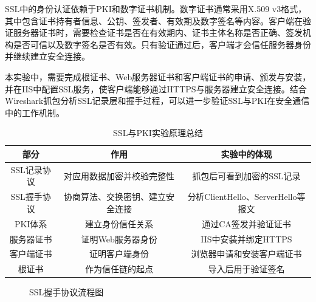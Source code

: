 \documentclass[12pt]{ctexart}
\begin{document}
SSL中的身份认证依赖于PKI和数字证书机制。数字证书通常采用X.509 v3格式，其中包含证书持有者信息、公钥、签发者、有效期及数字签名等内容。客户端在验证服务器证书时，需要检查证书是否在有效期内、证书主体名称是否正确、签发机构是否可信以及数字签名是否有效。只有验证通过后，客户端才会信任服务器身份并继续建立安全连接。

本实验中，需要完成根证书、Web服务器证书和客户端证书的申请、颁发与安装，并在IIS中配置SSL服务，使客户端能够通过HTTPS与服务器建立安全连接。结合Wireshark抓包分析SSL记录层和握手过程，可以进一步验证SSL与PKI在安全通信中的工作机制。


\begin{table}[H]
\centering
\caption{SSL与PKI实验原理总结}
\begin{tabular}{|c|c|c|}
\hline
\textbf{部分} & \textbf{作用} & \textbf{实验中的体现} \\ \hline
SSL记录协议 & 对应用数据加密并校验完整性 & 抓包后可看到加密的SSL记录 \\ \hline
SSL握手协议 & 协商算法、交换密钥、建立安全连接 & 分析ClientHello、ServerHello等报文 \\ \hline
PKI体系 & 建立身份信任关系 & 通过CA签发并验证证书 \\ \hline
服务器证书 & 证明Web服务器身份 & IIS中安装并绑定HTTPS \\ \hline
客户端证书 & 证明客户端身份 & 浏览器申请和安装客户端证书 \\ \hline
根证书 & 作为信任链的起点 & 导入后用于验证签名 \\ \hline
\end{tabular}
\end{table}

\begin{figure}[H]
\centering
{}
\caption{SSL握手协议流程图}
\end{figure}
\end{document}
